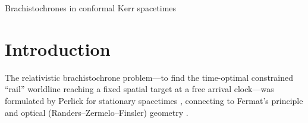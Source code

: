 \documentclass[12pt]{iopart}
\theoremstyle{plain}
\theoremstyle{definition}
\theoremstyle{remark}
\begin{document}
\maketitle
%
         {Brachistochrones in conformal Kerr spacetimes}

\section{Introduction}
\label{sec:intro}
The relativistic brachistochrone problem---to find the time-optimal constrained ``rail''
worldline reaching a fixed spatial target at a free arrival clock---was formulated by
Perlick for stationary
spacetimes \cite{Perlick1991,PerlickRayOptics}, connecting to Fermat's principle and
optical (Randers--Zermelo--Finsler) geometry
\cite{Kovner1990,Randers1941,GibbonsWerner2008,GibbonsRanders2009,BaoRoblesShen}.
\end{document}
